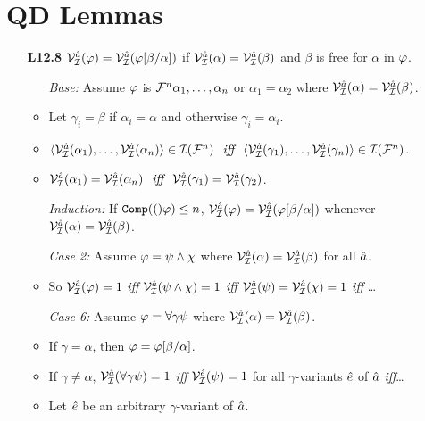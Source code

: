 \documentclass[a4paper, 11pt]{article} %
\begin{document}
\vspace{-.2in}



\section*{QD Lemmas}

\begin{enumerate}[labelsep=.1in]
  \item[\bf L12.8] $\mathcal{V}_{\mathcal{I}}^{\hat{a}}(\varphi)=\mathcal{V}_{\mathcal{I}}^{\hat{a}}(\varphi[\beta/\alpha])$ if $\mathcal{V}_{\mathcal{I}}^{\hat{a}}(\alpha)=\mathcal{V}_{\mathcal{I}}^{\hat{a}}(\beta)$ and $\beta$ is free for $\alpha$ in $\varphi$.
    \begin{itemize}
      \item[\it Base:] Assume $\varphi$ is $\mathcal{F}^n\alpha_1,\ldots,\alpha_n$ or $\alpha_1=\alpha_2$ where $\mathcal{V}_{\mathcal{I}}^{\hat{a}}(\alpha)=\mathcal{V}_{\mathcal{I}}^{\hat{a}}(\beta)$. 
      \item Let $\gamma_i=\beta$ if $\alpha_i=\alpha$ and otherwise $\gamma_i=\alpha_i$.
      \item $\langle\mathcal{V}_{\mathcal{I}}^{\hat{a}}(\alpha_1),\ldots,\mathcal{V}_{\mathcal{I}}^{\hat{a}}(\alpha_n)\rangle\in\mathcal{I}(\mathcal{F}^n) \textit{ ~iff~ } \langle\mathcal{V}_{\mathcal{I}}^{\hat{a}}(\gamma_1),\ldots,\mathcal{V}_{\mathcal{I}}^{\hat{a}}(\gamma_n)\rangle\in\mathcal{I}(\mathcal{F}^n)$.
      \item $\mathcal{V}_{\mathcal{I}}^{\hat{a}}(\alpha_1)=\mathcal{V}_{\mathcal{I}}^{\hat{a}}(\alpha_n) \textit{ ~iff~ } \mathcal{V}_{\mathcal{I}}^{\hat{a}}(\gamma_1)=\mathcal{V}_{\mathcal{I}}^{\hat{a}}(\gamma_2)$.
      \item[\it Induction:] If $\texttt{Comp}(()\varphi)\leq n$, $\mathcal{V}_{\mathcal{I}}^{\hat{a}}(\varphi)=\mathcal{V}_{\mathcal{I}}^{\hat{a}}(\varphi[\beta/\alpha])$ whenever $\mathcal{V}_{\mathcal{I}}^{\hat{a}}(\alpha)=\mathcal{V}_{\mathcal{I}}^{\hat{a}}(\beta)$.
      \item[\it Case 2:] Assume $\varphi=\psi\wedge\chi$ where $\mathcal{V}_{\mathcal{I}}^{\hat{a}}(\alpha)=\mathcal{V}_{\mathcal{I}}^{\hat{a}}(\beta)$ for all $\hat{a}$.
      \item So $\mathcal{V}_{\mathcal{I}}^{\hat{a}}(\varphi)=1$ \textit{iff} $\mathcal{V}_{\mathcal{I}}^{\hat{a}}(\psi\wedge\chi)=1$ \textit{iff} $\mathcal{V}_{\mathcal{I}}^{\hat{a}}(\psi)=\mathcal{V}_{\mathcal{I}}^{\hat{a}}(\chi)=1$ \textit{iff} \ldots
      \item[\it Case 6:] Assume $\varphi=\forall \gamma\psi$ where $\mathcal{V}_{\mathcal{I}}^{\hat{a}}(\alpha)=\mathcal{V}_{\mathcal{I}}^{\hat{a}}(\beta)$.
      \item If $\gamma=\alpha$, then $\varphi=\varphi[\beta/\alpha]$.
      \item If $\gamma\neq\alpha$, $\mathcal{V}_{\mathcal{I}}^{\hat{a}}(\forall \gamma\psi)=1$ \textit{iff} $\mathcal{V}_{\mathcal{I}}^{\hat{e}}(\psi)=1$ for all $\gamma$-variants $\hat{e}$ of $\hat{a}$ \textit{iff}\ldots
      \item Let $\hat{e}$ be an arbitrary $\gamma$-variant of $\hat{a}$.

\end{itemize}
\end{enumerate}
\end{document}
